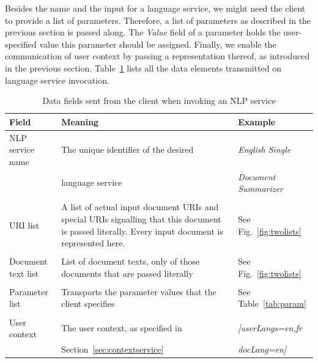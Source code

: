 Besides the name and the input for a language service, we might need
the client to provide a list of parameters. Therefore, a list of
parameters as described in the previous section is passed along. The
\emph{Value} field of a parameter holds the user-specified value this
parameter should be assigned. Finally, we enable the communication of
user context by passing a representation thereof, as introduced in the
previous section. Table~\ref{tab:invocation} lists all the data
elements transmitted on language service invocation.

\begin{table}
 \centering\small\sffamily
 \begin{tabular}{p{}@{\hspace*{4mm}}p{}@{\hspace*{4mm}}p{}}
   \toprule
   \textbf{Field} & \textbf{Meaning} & \textbf{Example} \\
   \midrule
   NLP service name & The unique identifier of the desired & \emph{English Single} \\
    & language service & \emph{Document Summarizer} \\

    & & \\

   URI list & A list of actual input document URIs and special URIs
   signalling that this document is passed literally. Every input
   document is represented here. & See Fig.~\ref{fig:twolists}  \\

    & & \\

   Document text list & List of document texts, only of those
   documents that are passed literally & See Fig.~\ref{fig:twolists}
   \\

    & & \\

   Parameter list & Transports the parameter values that the client
   specifies & See Table~\ref{tab:param} \\

    & & \\

   User context & The user context, as specified in &
   \emph{[userLangs=en,fr} \\
    & Section~\ref{sec:contextservice} & \emph{docLang=en]}\\
 
   \bottomrule
\end{tabular}
 \caption{Data fields sent from the client when invoking an NLP service}
 \label{tab:invocation}
\end{table}

